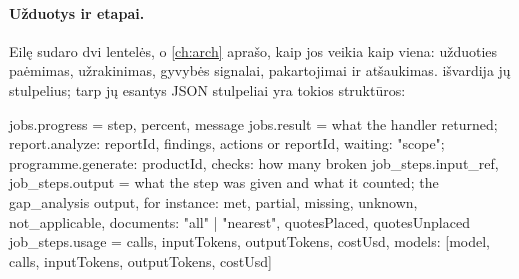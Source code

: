 \paragraph{Užduotys ir etapai.} Eilę sudaro dvi lentelės, o \cref{ch:arch} aprašo, kaip jos
veikia kaip viena: užduoties paėmimas, užrakinimas, gyvybės signalai, pakartojimai ir
atšaukimas.  išvardija jų stulpelius; tarp jų esantys JSON stulpeliai yra
tokios struktūros:

\begin{codeblock}
jobs.progress   = {step, percent, message}
jobs.result     = what the handler returned; report.analyze:
                  {reportId, findings, actions} or {reportId, waiting: "scope"};
                  programme.generate: {productId, checks: how many broken}
job_steps.input_ref, job_steps.output
                = what the step was given and what it counted; the
                  gap_analysis output, for instance: {met, partial, missing,
                  unknown, not_applicable, documents: "all" | "nearest",
                  quotesPlaced, quotesUnplaced}
job_steps.usage = {calls, inputTokens, outputTokens, costUsd,
                   models: [{model, calls, inputTokens, outputTokens, costUsd}]}
\end{codeblock}

